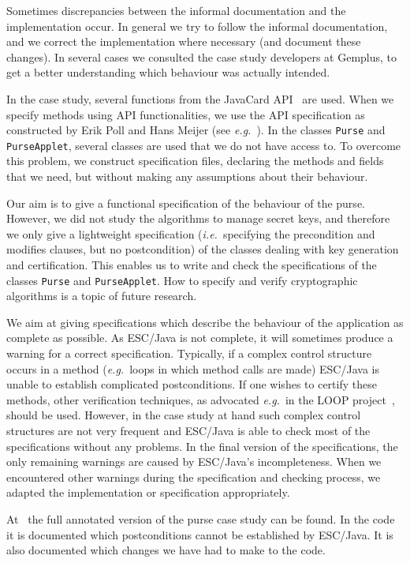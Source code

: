 \documentclass[a4paper]{llncs}
\begin{document}
Sometimes discrepancies between the informal documentation and the
implementation occur. In general we try to follow the informal
documentation, and we correct the implementation where necessary
(and document these changes). In several cases we consulted the case
study developers at Gemplus, to get a better understanding which
behaviour was actually intended.

In the case study, several functions from the JavaCard
API~\cite{JavaCardAPI} are used. When we specify methods using API
functionalities, we use the API specification as constructed by Erik
Poll and Hans Meijer (see \emph{e.g.}~\cite{MeijerP01}).  In the
classes \texttt{Purse} and \texttt{PurseApplet}, several classes are
used that we do not have access to. To overcome this problem, we
construct specification files, declaring the methods and fields that we need,
but without making any assumptions about their behaviour.

Our aim is to give a functional specification of the behaviour of the
purse. However, we did not study the algorithms to manage secret keys,
and therefore we only give a lightweight specification
(\emph{i.e.}~specifying the precondition and modifies clauses, but no
postcondition) of the classes dealing with key generation and
certification. This enables us to write and check the specifications of
the classes \texttt{Purse} and \texttt{PurseApplet}. How to specify
and verify cryptographic algorithms is a topic of future research.


We aim at giving specifications which describe the behaviour of the
application as complete as possible. As ESC/Java is not complete, it
will sometimes produce a warning for a correct specification. 
Typically, if a complex control structure occurs in a method
(\emph{e.g.}~loops in which method calls are made) ESC/Java is unable
to establish complicated postconditions. If one wishes to certify
these methods, other verification techniques, as advocated
\emph{e.g.}~in the LOOP project~\cite{LOOPUrl}, should be
used. However, in the case study at hand such complex control
structures are not very frequent and ESC/Java is able to check most of
the specifications without any problems. In the final version of the
specifications, the only remaining warnings are caused by ESC/Java's
incompleteness. When we encountered other warnings during the
specification and checking process, we adapted the implementation or
specification appropriately.

At~\cite{CatanoH01Url} the full annotated version of the purse case
study can be found. In the code it is documented which postconditions
cannot be established by ESC/Java. It is also documented which changes 
we have had to make to the code.
\end{document}

